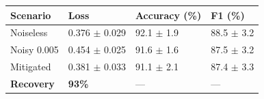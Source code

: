 \begin{tabular}{llll}
\toprule
Scenario & Loss & Accuracy (\%) & F1 (\%) \\
\midrule
Noiseless & 0.376 $\pm$ 0.029 & 92.1 $\pm$ 1.9 & 88.5 $\pm$ 3.2 \\
Noisy 0.005 & 0.454 $\pm$ 0.025 & 91.6 $\pm$ 1.6 & 87.5 $\pm$ 3.2 \\
Mitigated & 0.381 $\pm$ 0.033 & 91.1 $\pm$ 2.1 & 87.4 $\pm$ 3.3 \\
\textbf{Recovery} & \textbf{93\%} & --- & --- \\
\bottomrule
\end{tabular}
